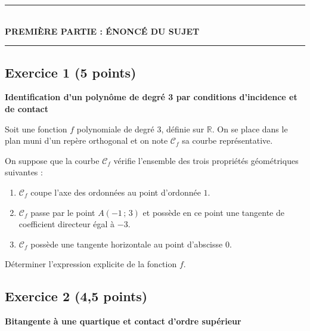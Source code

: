 \documentclass[11pt,a4paper]{article}
\newcommand{\R}{\mathbb{R}}
\begin{document}
\vspace{0.4cm}

\begin{center}
    \rule{0.35\textwidth}{0.8pt}\\[0.15cm]
    {\Large \bfseries PREMIÈRE PARTIE : ÉNONCÉ DU SUJET}\\[0.1cm]
    \rule{0.35\textwidth}{0.8pt}
\end{center}

\vspace{0.2cm}

\subsection*{Exercice 1 \hfill \normalfont\normalsize (5 points)}
\textbf{Identification d'un polynôme de degré 3 par conditions d'incidence et de contact}

\medskip
Soit une fonction $f$ polynomiale de degré 3, définie sur $\R$. On se place dans le plan muni d'un repère orthogonal et on note $\mathcal{C}_f$ sa courbe représentative.

On suppose que la courbe $\mathcal{C}_f$ vérifie l'ensemble des trois propriétés géométriques suivantes :
\begin{enumerate}[label=\textbf{\arabic*.}]
    \item $\mathcal{C}_f$ coupe l'axe des ordonnées au point d'ordonnée $1$.
    \item $\mathcal{C}_f$ passe par le point $A(-1\,;\,3)$ et possède en ce point une tangente de coefficient directeur égal à $-3$.
    \item $\mathcal{C}_f$ possède une tangente horizontale au point d'abscisse $0$.
\end{enumerate}

\medskip
Déterminer l'expression explicite de la fonction $f$.

\vspace{0.4cm}

\subsection*{Exercice 2 \hfill \normalfont\normalsize (4{,}5 points)}
\textbf{Bitangente à une quartique et contact d'ordre supérieur}
\end{document}
